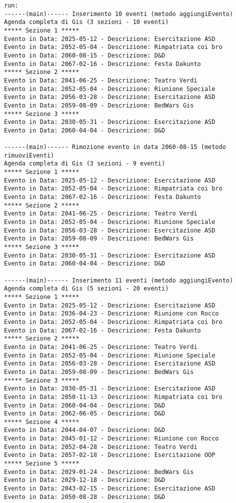 \documentclass[12pt, a4paper]{article}
\begin{document}
\small{
\begin{lstlisting}
run:
------(main)------ Inserimento 10 eventi (metodo aggiungiEvento)
Agenda completa di Gis (3 sezioni - 10 eventi)
***** Sezione 1 *****
Evento in Data: 2025-05-12 - Descrizione: Esercitazione ASD
Evento in Data: 2052-05-04 - Descrizione: Rimpatriata coi bro
Evento in Data: 2060-08-15 - Descrizione: D&D
Evento in Data: 2067-02-16 - Descrizione: Festa Dakunto
***** Sezione 2 *****
Evento in Data: 2041-06-25 - Descrizione: Teatro Verdi
Evento in Data: 2052-05-04 - Descrizione: Riunione Speciale
Evento in Data: 2056-03-28 - Descrizione: Esercitazione ASD
Evento in Data: 2059-08-09 - Descrizione: BedWars Gis
***** Sezione 3 *****
Evento in Data: 2030-05-31 - Descrizione: Esercitazione ASD
Evento in Data: 2060-04-04 - Descrizione: D&D

------(main)------ Rimozione evento in data 2060-08-15 (metodo rimuoviEventi)
Agenda completa di Gis (3 sezioni - 9 eventi)
***** Sezione 1 *****
Evento in Data: 2025-05-12 - Descrizione: Esercitazione ASD
Evento in Data: 2052-05-04 - Descrizione: Rimpatriata coi bro
Evento in Data: 2067-02-16 - Descrizione: Festa Dakunto
***** Sezione 2 *****
Evento in Data: 2041-06-25 - Descrizione: Teatro Verdi
Evento in Data: 2052-05-04 - Descrizione: Riunione Speciale
Evento in Data: 2056-03-28 - Descrizione: Esercitazione ASD
Evento in Data: 2059-08-09 - Descrizione: BedWars Gis
***** Sezione 3 *****
Evento in Data: 2030-05-31 - Descrizione: Esercitazione ASD
Evento in Data: 2060-04-04 - Descrizione: D&D

------(main)------ Inserimento 11 eventi (metodo aggiungiEvento)
Agenda completa di Gis (5 sezioni - 20 eventi)
***** Sezione 1 *****
Evento in Data: 2025-05-12 - Descrizione: Esercitazione ASD
Evento in Data: 2036-04-23 - Descrizione: Riunione con Rocco
Evento in Data: 2052-05-04 - Descrizione: Rimpatriata coi bro
Evento in Data: 2067-02-16 - Descrizione: Festa Dakunto
***** Sezione 2 *****
Evento in Data: 2041-06-25 - Descrizione: Teatro Verdi
Evento in Data: 2052-05-04 - Descrizione: Riunione Speciale
Evento in Data: 2056-03-28 - Descrizione: Esercitazione ASD
Evento in Data: 2059-08-09 - Descrizione: BedWars Gis
***** Sezione 3 *****
Evento in Data: 2030-05-31 - Descrizione: Esercitazione ASD
Evento in Data: 2050-11-13 - Descrizione: Rimpatriata coi bro
Evento in Data: 2060-04-04 - Descrizione: D&D
Evento in Data: 2062-06-05 - Descrizione: D&D
***** Sezione 4 *****
Evento in Data: 2044-04-07 - Descrizione: D&D
Evento in Data: 2045-01-12 - Descrizione: Riunione con Rocco
Evento in Data: 2052-04-28 - Descrizione: Teatro Verdi
Evento in Data: 2057-02-18 - Descrizione: Esercitazione OOP
***** Sezione 5 *****
Evento in Data: 2029-01-24 - Descrizione: BedWars Gis
Evento in Data: 2029-12-18 - Descrizione: D&D
Evento in Data: 2043-02-15 - Descrizione: Esercitazione ASD
Evento in Data: 2050-08-28 - Descrizione: D&D


\end{lstlisting}}
\end{document}
